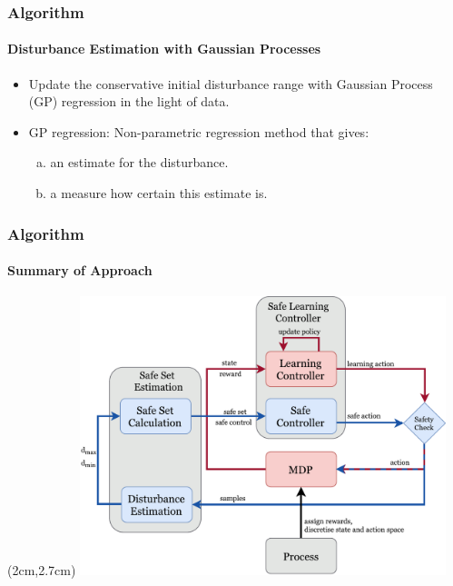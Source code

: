 \documentclass[t]{beamer}
\begin{document}
\begin{frame}
\frametitle{Algorithm}
\framesubtitle{Disturbance Estimation with Gaussian Processes}
\begin{itemize}
\item Update the conservative initial disturbance range with Gaussian Process (GP) regression in the light of data.
\item GP regression: Non-parametric regression method that gives:
\begin{enumerate}[a.]
\item an estimate for the disturbance.
\item a measure how certain this estimate is.
\end{enumerate}
\end{itemize}
\end{frame}

\begin{frame}
\frametitle{Algorithm}
\framesubtitle{Summary of Approach}
\begin{textblock*}{9.9cm}(2cm,2.7cm) %
\includegraphics[trim=3mm 3mm 3mm 14mm, width=0.8\textwidth]{flow}
\end{textblock*}
\end{frame}
\end{document}
